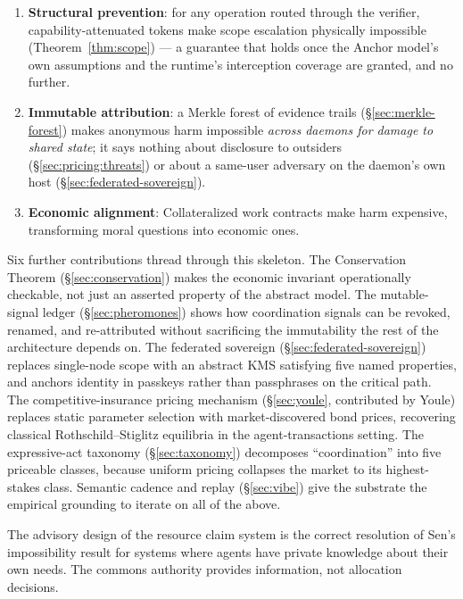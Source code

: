 \documentclass[11pt,a4paper]{article}
\theoremstyle{definition}
\theoremstyle{remark}
\begin{document}
\begin{enumerate}[nosep]
  \item \textbf{Structural prevention}: for any operation routed through the verifier, capability-attenuated tokens make scope escalation physically impossible (Theorem~\ref{thm:scope}) --- a guarantee that holds once the Anchor model's own assumptions and the runtime's interception coverage are granted, and no further.
  \item \textbf{Immutable attribution}: a Merkle forest of evidence trails (\S\ref{sec:merkle-forest}) makes anonymous harm impossible \emph{across daemons for damage to shared state}; it says nothing about disclosure to outsiders (\S\ref{sec:pricing:threats}) or about a same-user adversary on the daemon's own host (\S\ref{sec:federated-sovereign}).
  \item \textbf{Economic alignment}: Collateralized work contracts make harm expensive, transforming moral questions into economic ones.
\end{enumerate}

Six further contributions thread through this skeleton. The Conservation Theorem (\S\ref{sec:conservation}) makes the economic invariant operationally checkable, not just an asserted property of the abstract model. The mutable-signal ledger (\S\ref{sec:pheromones}) shows how coordination signals can be revoked, renamed, and re-attributed without sacrificing the immutability the rest of the architecture depends on. The federated sovereign (\S\ref{sec:federated-sovereign}) replaces single-node scope with an abstract KMS satisfying five named properties, and anchors identity in passkeys rather than passphrases on the critical path. The competitive-insurance pricing mechanism (\S\ref{sec:youle}, contributed by Youle) replaces static parameter selection with market-discovered bond prices, recovering classical Rothschild--Stiglitz equilibria in the agent-transactions setting. The expressive-act taxonomy (\S\ref{sec:taxonomy}) decomposes ``coordination'' into five priceable classes, because uniform pricing collapses the market to its highest-stakes class. Semantic cadence and replay (\S\ref{sec:vibe}) give the substrate the empirical grounding to iterate on all of the above.

The advisory design of the resource claim system is the correct resolution of Sen's impossibility result for systems where agents have private knowledge about their own needs. The commons authority provides information, not allocation decisions.
\end{document}
